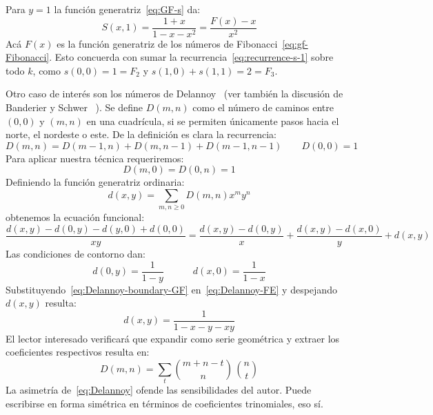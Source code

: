   Para \(y = 1\) la función generatriz~\eqref{eq:GF-s} da:
  \begin{equation*}
    S(x, 1)
      = \frac{1 + x}{1 - x - x^2}
      = \frac{F(x) - x}{x^2}
  \end{equation*}
  Acá \(F(x)\) es la función generatriz
  de los números de Fibonacci~\eqref{eq:gf-Fibonacci}.
  Esto concuerda con sumar la recurrencia~\eqref{eq:recurrence-s-1}
  sobre todo \(k\),
  como \(s(0, 0) = 1 = F_2\) y \(s(1, 0) + s(1, 1) = 2 = F_3\).

  Otro caso de interés son los números de Delannoy~%
    \cite{delannoy95:_quest_probab}
  (ver también la discusión de Banderier y Schwer~%
    \cite{banderier05:_why_delannoy_numbers}).
  Se define \(D(m, n)\)
  como el número de caminos entre \((0, 0)\) y \((m, n)\)
  en una cuadrícula,
  si se permiten únicamente pasos hacia el norte, el nordeste o este.
  De la definición es clara la recurrencia:
  \begin{equation}
    \label{eq:Delannoy-recurrence}
    D(m, n)
      = D(m - 1, n) + D(m, n - 1) + D(m - 1, n - 1)
    \qquad D(0, 0) = 1
  \end{equation}
  Para aplicar nuestra técnica requeriremos:
  \begin{equation}
    \label{eq:Delannoy-boundary}
    D(m, 0) = D(0, n) = 1
  \end{equation}
  Definiendo la función generatriz ordinaria:
  \begin{equation}
    \label{eq:Delannoy-GF-definition}
    d(x, y)
      = \sum_{m, n \ge 0} D(m, n) x^m y^n
  \end{equation}
  obtenemos la ecuación funcional:
  \begin{equation}
    \label{eq:Delannoy-FE}
    \frac{d(x, y) - d(0, y) - d(y, 0) + d(0, 0)}{x y}
      = \frac{d(x, y) - d(0, y)}{x} + \frac{d(x, y) - d(x, 0)}{y} + d(x, y)
  \end{equation}
  Las condiciones de contorno dan:
  \begin{equation}
    \label{eq:Delannoy-boundary-GF}
    d(0, y)
      = \frac{1}{1 - y}
    \hspace{3em}
    d(x, 0)
      = \frac{1}{1 - x}
  \end{equation}
  Substituyendo~\eqref{eq:Delannoy-boundary-GF} en~\eqref{eq:Delannoy-FE}
  y despejando \(d(x, y)\) resulta:
  \begin{equation}
    \label{eq:Delannoy-GF}
    d(x, y)
      = \frac{1}{1 - x - y - x y}
  \end{equation}
  El lector interesado verificará que expandir como serie geométrica
  y extraer los coeficientes respectivos resulta en:
  \begin{equation}
    \label{eq:Delannoy}
      D(m, n)
	= \sum_t \binom{m + n - t}{n} \, \binom{n}{t}
  \end{equation}
  La asimetría de~\eqref{eq:Delannoy}
  ofende las sensibilidades del autor.
  Puede escribirse en forma simétrica en términos de coeficientes trinomiales,
  eso sí.

